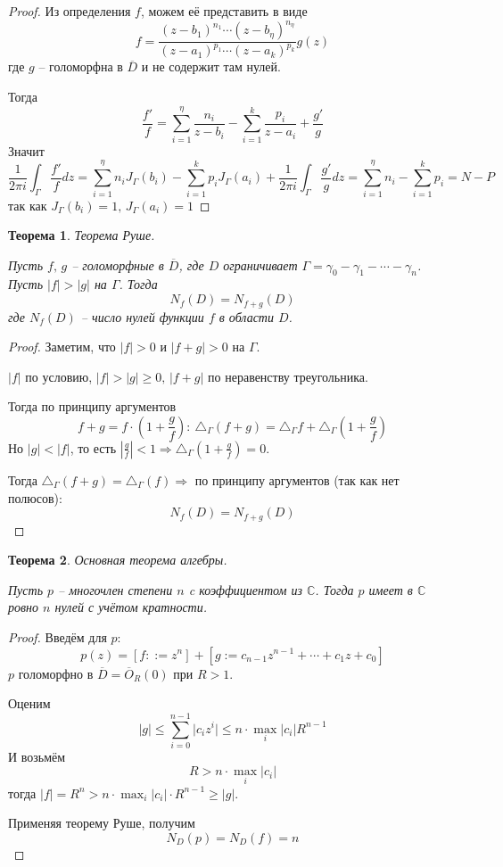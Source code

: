 \documentclass[a4paper,12pt]{article}
\renewcommand{\leq}{\ensuremath{\leqslant}}
\renewcommand{\geq}{\ensuremath{\geqslant}}
\theoremstyle{plain}
\newtheorem{theorem}{Теорема}[section]
\theoremstyle{definition}
\theoremstyle{remark}
\begin{document}
\begin{proof}
	Из определения $f$, можем её представить в виде
	\[
		f = \frac{(z - b_1)^{n_1}\cdots(z - b_\eta)^{n_\eta}}{(z - a_1)^{p_1}\cdots(z - a_k)^{p_k}}g(z)
	\]
	где $g$ -- голоморфна в $\overline{D}$ и не содержит там нулей.

	Тогда
	\[
		\frac{f'}{f} = \sum_{i = 1}^\eta\frac{n_i}{z - b_i} - \sum_{i = 1}^k\frac{p_i}{z - a_i} + \frac{g'}{g}
	\]
	Значит
	\[
		\frac{1}{2\pi i} \int_\Gamma\frac{f'}{f}dz = \sum_{i = 1}^\eta n_iJ_\Gamma(b_i) - \sum_{i = 1}^k p_iJ_\Gamma(a_i) + \frac{1}{2\pi i}\int_\Gamma\frac{g'}{g}dz = \sum_{i = 1}^\eta n_i - \sum_{i = 1}^k p_i = N - P
	\]
	так как $J_\Gamma(b_i) = 1,\, J_\Gamma(a_i) = 1$
\end{proof}

\begin{theorem}
	Теорема Руше.

	Пусть $f,\, g$ -- голоморфные в $\overline{D}$, где $D$ ограничивает $\Gamma = \gamma_0 - \gamma_1 - \cdots - \gamma_n$. Пусть $\vert f\vert > \vert g\vert$ на $\Gamma$. Тогда
	\[
		N_f(D) = N_{f + g}(D)
	\]
	где $N_f(D)$ -- число нулей функции $f$ в области $D$.
\end{theorem}

\begin{proof}
	Заметим, что $\vert f\vert > 0$ и $\vert f + g\vert > 0$ на $\Gamma$.

	$\vert f\vert$ по условию, $\vert f\vert > \vert g\vert \geq 0,\, \vert f + g\vert$ по неравенству треугольника.

	Тогда по принципу аргументов
	\[
		f + g = f\cdot\left(1 + \frac{g}{f}\right) :\: \triangle_\Gamma(f + g) = \triangle_\Gamma f + \triangle_\Gamma\left(1 + \frac{g}{f}\right)
	\]
	Но $\vert g\vert < \vert f\vert$, то есть $\left\vert\frac{g}{f}\right\vert < 1 \Rightarrow \triangle_\Gamma\left(1 + \frac{g}{f}\right) = 0$.

	Тогда $\triangle_\Gamma(f + g) = \triangle_\Gamma(f) \Rightarrow$ по принципу аргументов (так как нет полюсов):
	\[
		N_f(D) = N_{f +g}(D)
	\]
\end{proof}

\begin{theorem}
	Основная теорема алгебры.

	Пусть $p$ -- многочлен степени $n$ c коэффициентом из $\mathbb{C}$. Тогда $p$ имеет в $\mathbb{C}$ ровно $n$ нулей с учётом кратности.
\end{theorem}

\begin{proof}
	Введём для $p$:
	\[
		p(z) = [f ::= z^n] + [g := c_{n - 1}z^{n - 1} + \cdots + c_1z + c_0]
	\]
	$p$ голоморфно в $\overline{D} = \overline{O}_R(0)$ при $R > 1$.

	Оценим
	\[
		\vert g\vert \leq \sum_{i = 0}^{n - 1}\vert c_iz^i\vert \leq n\cdot\max_i\vert c_i\vert R^{n - 1}
	\]
	И возьмём
	\[
		R > n\cdot\max_i\vert c_i\vert
	\]
	тогда $\vert f\vert = R^n > n\cdot\max_i\vert c_i\vert\cdot R^{n - 1} \geq \vert g\vert$.

	Применяя теорему Руше, получим
	\[
		N_D(p) = N_D(f) = n
	\]
\end{proof}
\end{document}
